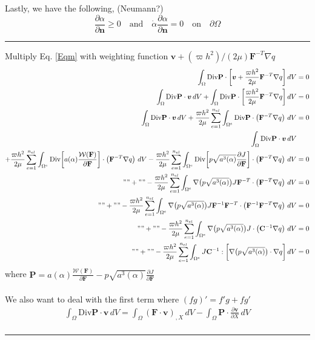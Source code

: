 \documentclass[12pt,3p]{article}
\numberwithin{equation}{section}
\begin{document}
Lastly, we have the following, (Neumann?)
\begin{equation}
\frac{\partial \alpha}{\partial \mathbf{n}} \geq 0 \quad \text{and} \quad \dot{\alpha} \frac{\partial \alpha}{\partial \mathbf{n}} = 0 \quad \text{on} \quad \partial \Omega
\end{equation}
\noindent\rule{\linewidth}{0.5pt} %
Multiply Eq. \ref{Eqm} with weighting function $\bm{v}+(\varpi h^2)/(2\mu)\mathbf{F}^{-T}\nabla q$
\begin{align*}
\int_{\Omega} \text{Div} \mathbf{P} \cdot \bigg[ \bm{v} + \frac{\varpi h^2}{2\mu} \mathbf{F}^{-T}\nabla q \bigg] \, dV &= 0 \\
\int_{\Omega} \text{Div} \mathbf{P} \cdot \bm{v} \, dV + \int_{\Omega} \text{Div} \mathbf{P} \cdot \bigg[ \frac{\varpi h^2}{2\mu} \mathbf{F}^{-T}\nabla q \bigg] \, dV &= 0 \\
\int_{\Omega} \text{Div} \mathbf{P} \cdot \bm{v} \, dV + \frac{\varpi h^2}{2\mu} \sum_{e=1}^{n_{el}}\int_{\Omega^{e}} \text{Div} \mathbf{P} \cdot \left(\mathbf{F}^{-T}\nabla q\right) \,dV &= 0 \\
\int_{\Omega} \text{Div} \mathbf{P} \cdot \bm{v} \, dV &\\
+ \frac{\varpi h^2}{2\mu} \sum_{e=1}^{n_{el}}\int_{\Omega^{e}} \text{Div} \bigg[ a(\alpha) \frac{\mathcal{W}(\mathbf{F})}{\partial \mathbf{F}} \bigg] \cdot \left(\mathbf{F}^{-T} \nabla q \right) \,dV - \frac{\varpi h^2}{2\mu} \sum_{e=1}^{n_{el}}\int_{\Omega^{e}} \text{Div} \bigg[ p \sqrt{a^3(\alpha)} \frac{\partial J}{\partial \mathbf{F}} \bigg] \cdot \left(\mathbf{F}^{-T} \nabla q \right) \,dV &= 0 \\
"" + "" - \frac{\varpi h^2}{2\mu} \sum_{e=1}^{n_{el}}\int_{\Omega^{e}} \nabla \big( p \sqrt{a^3(\alpha)} \big) J \mathbf{F}^{-T} \cdot \left(\mathbf{F}^{-T}\nabla q \right) \,dV &= 0 \\
"" + "" - \frac{\varpi h^2}{2\mu} \sum_{e=1}^{n_{el}}\int_{\Omega^{e}} \nabla \big( p \sqrt{a^3(\alpha)} \big) J \mathbf{F}^{-1} \mathbf{F}^{-T} \cdot \left( \mathbf{F}^{-1} \mathbf{F}^{-T}\nabla q \right) \,dV &= 0 \\
"" + "" - \frac{\varpi h^2}{2\mu} \sum_{e=1}^{n_{el}}\int_{\Omega^{e}} \nabla \big( p \sqrt{a^3(\alpha)} \big) J \cdot \left( \mathbf{C}^{-1} \nabla q \right) \,dV &= 0 \\
"" + "" - \frac{\varpi h^2}{2\mu} \sum_{e=1}^{n_{el}}\int_{\Omega^{e}} J \mathbf{C}^{-1} : \bigg[ \nabla \big( p \sqrt{a^3(\alpha)} \big) \cdot \nabla q \bigg] \,dV &= 0 
\end{align*}
where $\mathbf{P} = a(\alpha) \frac{\mathcal{W}(\mathbf{F})}{\partial \mathbf{F}} - p \sqrt{a^3(\alpha)} \frac{\partial J}{\partial \mathbf{F}}$ \\ \\
We also want to deal with the first term where $(fg)' = f' g + f g'$
\begin{align*}
\int_{\Omega} \text{Div} \mathbf{P} \cdot \bm{v} \, dV = \int_{\Omega} (\mathbf{F} \cdot \bm{v})_{,X} \, dV - \int_{\Omega} \mathbf{P} \cdot \frac{\partial \bm{v}}{\partial X} \, dV \\
\end{align*}
\noindent\rule{\linewidth}{0.5pt} %
\end{document}
